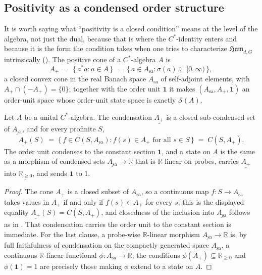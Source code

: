 \documentclass[12pt]{article}
\newcommand{\cond}[1]{\underline{#1}}          %
\newcommand{\Ham}{\mathfrak{Ham}}              %
\newcommand{\St}{\mathcal{S}}                   %
\newcommand{\RR}{\mathbb{R}}
\newcommand{\id}{\mathbf{1}}
\theoremstyle{plain}
\begin{document}
\subsection{Positivity as a condensed order structure}
\label{sec:cone}

It is worth saying what ``positivity is a closed condition'' means at the level of
the algebra, not just the dual, because that is where the $C^{*}$-identity enters and
because it is the form the condition takes when one tries to characterize
$\Ham_{d,G}$ intrinsically (). The positive cone of a
$C^{*}$-algebra $A$ is
\[
  A_{+} \;=\; \{\, a^{*}a : a\in A \,\} \;=\; \{\, a\in A_{\mathrm{sa}} : \sigma(a)\subseteq[0,\infty) \,\},
\]
a closed convex cone in the real Banach space $A_{\mathrm{sa}}$ of self-adjoint
elements, with $A_{+}\cap(-A_{+})=\{0\}$; together with the order unit $\id$ it makes
$(A_{\mathrm{sa}},A_{+},\id)$ an order-unit space whose order-unit state space is
exactly $\St(A)$.

\begin{proposition}
\label{prop:cone}
Let $A$ be a unital $C^{*}$-algebra. The condensation $\cond{A_{+}}$ is a closed
sub-condensed-set of $\cond{A_{\mathrm{sa}}}$, and for every profinite $S$,
\[
  \cond{A_{+}}(S) \;=\; \{\, f\in C(S,A_{\mathrm{sa}}) : f(s)\in A_{+} \text{ for all } s\in S \,\}
  \;=\; C(S,A_{+}).
\]
The order unit condenses to the constant section $\id$, and a state on $A$ is the
same as a morphism of condensed sets $\cond{A_{\mathrm{sa}}}\to\cond{\RR}$ that is
$\RR$-linear on probes, carries $\cond{A_{+}}$ into $\cond{\RR_{\ge 0}}$, and sends
$\id$ to $1$.
\end{proposition}

\begin{proof}
The cone $A_{+}$ is a closed subset of $A_{\mathrm{sa}}$, so a continuous map
$f:S\to A_{\mathrm{sa}}$ takes values in $A_{+}$ if and only if $f(s)\in A_{+}$ for
every $s$; this is the displayed equality $\cond{A_{+}}(S)=C(S,A_{+})$, and
closedness of the inclusion into $\cond{A_{\mathrm{sa}}}$ follows as in
. That condensation carries the order unit to the constant
section is immediate. For the last clause, a probe-wise $\RR$-linear morphism
$\cond{A_{\mathrm{sa}}}\to\cond{\RR}$ is, by full faithfulness of condensation on the
compactly generated space $A_{\mathrm{sa}}$, a continuous $\RR$-linear functional
$\phi:A_{\mathrm{sa}}\to\RR$; the conditions $\phi(A_{+})\subseteq\RR_{\ge0}$ and
$\phi(\id)=1$ are precisely those making $\phi$ extend to a state on $A$.
\end{proof}
\end{document}
